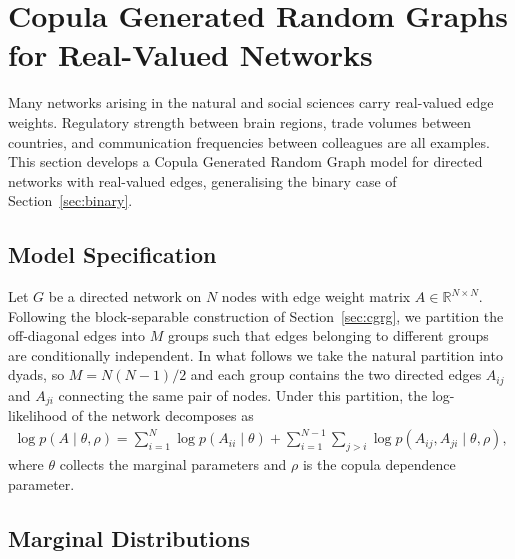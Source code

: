 
\section{Copula Generated Random Graphs for Real-Valued Networks}
\label{sec:realvalued}

Many networks arising in the natural and social sciences carry real-valued
edge weights.  Regulatory strength between brain regions, trade volumes
between countries, and communication frequencies between colleagues are
all examples.  This section develops a Copula Generated Random Graph
model for directed networks with real-valued edges, generalising the
binary case of Section~\ref{sec:binary}.

\subsection{Model Specification}

Let $G$ be a directed network on $N$ nodes with edge weight matrix
$A \in \mathbb{R}^{N \times N}$.  Following the block-separable construction
of Section~\ref{sec:cgrg}, we partition the off-diagonal edges
into $M$ groups such that edges belonging to different groups are
conditionally independent.  In what follows we take the natural partition
into dyads, so $M = N(N-1)/2$ and each group contains the two directed
edges $A_{ij}$ and $A_{ji}$ connecting the same pair of nodes.  Under this
partition, the log-likelihood of the network decomposes as
%
\begin{align}
\label{eq:real_loglik}
\log p(A \mid \theta, \rho)
  = \sum_{i=1}^{N} \log p(A_{ii} \mid \theta)
  + \sum_{i=1}^{N-1} \sum_{j > i}
    \log p(A_{ij}, A_{ji} \mid \theta, \rho),
\end{align}
%
where $\theta$ collects the marginal parameters and $\rho$ is the copula
dependence parameter.

\subsection{Marginal Distributions}

